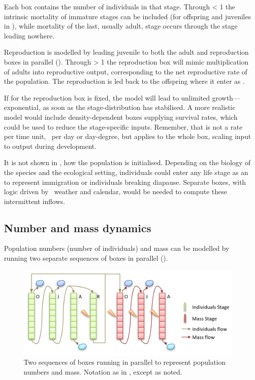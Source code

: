 Each  box contains the number of individuals in that stage. Through  < 1 the intrinsic mortality of immature stages can be included (for offspring and juveniles in ), while mortality of the last, usually adult, stage occurs through the stage  leading nowhere.

Reproduction is modelled by leading juvenile  to both the adult and reproduction boxes in parallel (). Through  > 1 the reproduction box will mimic multiplication of adults into reproductive output, corresponding to the net reproductive rate of the population. The reproduction  is led back to the offspring where it enter as .

If  for the reproduction box is fixed, the model will lead to unlimited growth---exponential, as soon as the stage-distribution has stabilised. A more realistic model would include density-dependent boxes supplying survival rates, which could be used to reduce the stage-specific  inputs. Remember, that  is not a rate per time unit, \eg\ per day or day-degree, but applies to the whole box, scaling input to output during development.

It is not shown in , how the population is initialised. Depending on the biology of the species and the ecological setting, individuals could enter  any life stage as an  to represent immigration or individuals breaking diapause. Separate boxes, with logic driven by \eg\ weather and calendar, would be needed to compute these intermittent inflows.

\subsection {Number and mass dynamics}

Population numbers (\ie number of individuals) and mass can be modelled by running two separate sequences of  boxes
in parallel ().

\begin{figure} [ht]
\centering
\includegraphics[width=.9\textwidth]{graphics/phys-dev-appl-2}
\caption{Two sequences of  boxes running in parallel to represent population numbers and mass. Notation as in , except as noted.} 
\label{fig:phys-dev-appl-2}
\end{figure}

